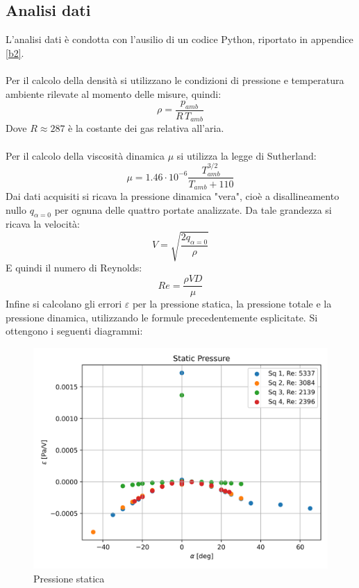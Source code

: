 \subsection{Analisi dati}
L'analisi dati è condotta con l'ausilio di un codice Python, riportato in appendice \ref{b2}.\\\\
Per il calcolo della densità si utilizzano le condizioni di pressione e temperatura ambiente rilevate al momento delle misure, quindi:
\begin{equation*}
    \rho = \frac{p_{amb}}{R\,T_{amb}}
\end{equation*}
Dove $R\approx 287$ è la costante dei gas relativa all'aria.\\\\
Per il calcolo della viscosità dinamica $\mu$ si utilizza la legge di Sutherland:
\begin{equation*}
    \mu = 1.46\cdot10^{-6} \frac{T_{amb}^{3/2}}{T_{amb}+110}
\end{equation*}
Dai dati acquisiti si ricava la pressione dinamica "vera", cioè a disallineamento nullo $q_{\alpha=0}$ per ognuna delle quattro portate analizzate. Da tale grandezza si ricava la velocità:
\begin{equation*}
    V = \sqrt{\frac{2q_{\alpha=0}}{\rho}}
\end{equation*}
E quindi il numero di Reynolds:
\begin{equation*}
    Re = \frac{\rho V D}{\mu}
\end{equation*}
Infine si calcolano gli errori $\varepsilon$ per la pressione statica, la pressione totale e la pressione dinamica, utilizzando le formule precedentemente esplicitate.
\newpage
\noindent Si ottengono i seguenti diagrammi:
\begin{figure}[h!]
    \centering
    \includegraphics[width=.76\textwidth]{images/2/p.png}
    \caption{Pressione statica}
\end{figure}
